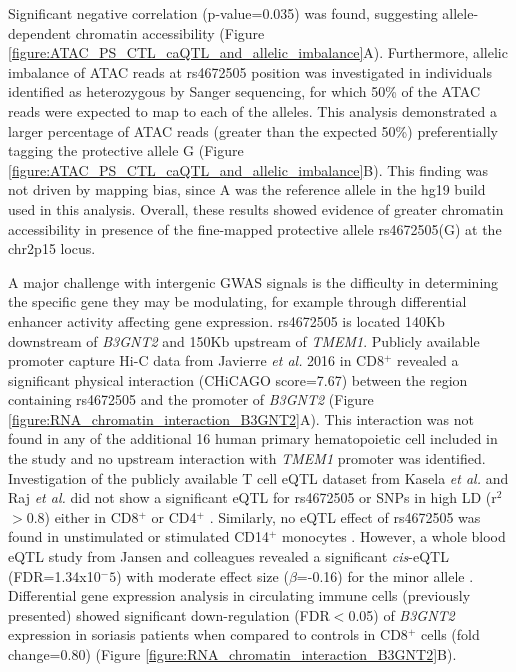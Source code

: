 Significant negative correlation (p-value=0.035) was found, suggesting allele-dependent chromatin accessibility (Figure \ref{figure:ATAC_PS_CTL_caQTL_and_allelic_imbalance}A). Furthermore, allelic imbalance of ATAC reads at rs4672505 position was investigated in individuals identified as heterozygous by Sanger sequencing, for which 50\% of the ATAC reads were expected to map to each of the alleles. This analysis demonstrated a larger percentage of ATAC reads (greater than the expected 50\%) preferentially tagging the protective allele G (Figure \ref{figure:ATAC_PS_CTL_caQTL_and_allelic_imbalance}B). This finding was not driven by mapping bias, since A was the reference allele in the hg19 build used in this analysis. Overall, these results showed evidence of greater chromatin accessibility in presence of the fine-mapped protective allele rs4672505(G) at the chr2p15 locus.
 

A major challenge with intergenic GWAS signals is the difficulty in determining the specific gene they may be modulating, for example through differential enhancer activity affecting gene expression. rs4672505 is located 140Kb downstream of \textit{B3GNT2} and 150Kb upstream of \textit{TMEM1}. Publicly available promoter capture Hi-C data from Javierre \textit{et al.} 2016 in CD8$^+$ revealed a significant physical interaction (CHiCAGO score=7.67) between the region containing rs4672505 and the promoter of \textit{B3GNT2} (Figure \ref{figure:RNA_chromatin_interaction_B3GNT2}A). This interaction was not found in any of the additional 16 human primary hematopoietic cell included in the study and no upstream interaction with \textit{TMEM1} promoter was identified. Investigation of the publicly available T cell eQTL dataset from Kasela \textit{et al.} and Raj \textit{et al.} did not show a significant eQTL for rs4672505 or SNPs in high LD (r$^2$$>$0.8) either in CD8$^+$ or CD4$^+$ \parencite{Raj2014,Kasela2017}. Similarly, no eQTL effect of rs4672505 was found in unstimulated or stimulated CD14$^+$ monocytes \parencite{Fairfax2014}. However, a whole blood eQTL study from Jansen and colleagues revealed a significant \textit{cis}-eQTL (FDR=1.34x10$^-5$) with moderate effect size ($\beta$=-0.16) for the minor allele \parencite{Jansen2017}. Differential gene expression analysis in circulating immune cells (previously presented) showed significant down-regulation (FDR$<$0.05) of \textit{B3GNT2} expression in soriasis patients when compared to controls in CD8$^+$ cells (fold change=0.80) (Figure \ref{figure:RNA_chromatin_interaction_B3GNT2}B). 

